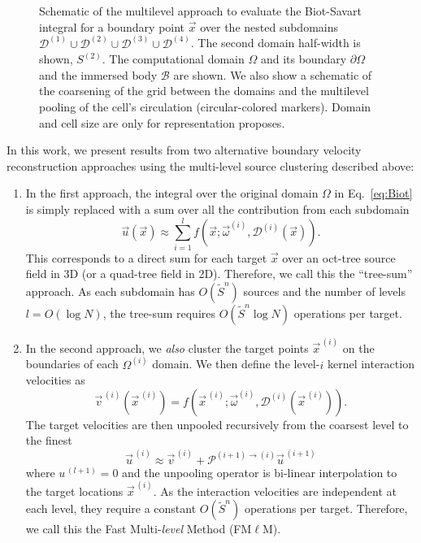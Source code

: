 \documentclass[final,1p,times]{elsarticle}
\begin{document}
\begin{figure}
    \centering
    \def\svgwidth{0.7\columnwidth}
    
    \caption{Schematic of the multilevel approach to evaluate the Biot-Savart integral for a boundary point $\vec x$ over the nested subdomains $\mathcal{D}^{(1)} \cup \mathcal{D}^{(2)} \cup \mathcal{D}^{(3)} \cup \mathcal{D}^{(4)}$. The second domain half-width is shown, ${S}^{(2)}$. The computational domain $\Omega$ and its boundary $\partial\Omega$ and the immersed body $\mathcal{B}$ are shown. We also show a schematic of the coarsening of the grid between the domains and the multilevel pooling of the cell's circulation (circular-colored markers). Domain and cell size are only for representation proposes.}
    \label{Fig_2}
\end{figure}

In this work, we present results from two alternative boundary velocity reconstruction approaches using the multi-level source clustering described above:

\begin{enumerate}
    \item In the first approach, the integral over the original domain $\Omega$ in Eq.~\ref{eq:Biot} is simply replaced with a sum over all the contribution from each subdomain
    \begin{equation}\label{eq:biot_sum}
        \vec u(\vec{x}) \approx \sum_{i=1}^{l} f(\vec{x}; \vec \omega^{(i)},\mathcal{D}^{(i)}(\vec x)).
    \end{equation}
    This corresponds to a direct sum for each target $\vec x$ over an oct-tree source field in 3D (or a quad-tree field in 2D). Therefore, we call this the ``tree-sum'' approach. As each subdomain has $O(\tilde S^n)$ sources and the number of levels $l=O(\log N)$, the tree-sum requires $O(\tilde S^n\log N)$ operations per target.
    \item In the second approach, we \textit{also} cluster the target points $\vec  x^{\,(i)}$ on the boundaries of each $\Omega^{(i)}$ domain. We then define the level-$i$ kernel interaction velocities as
    \begin{equation}\label{eq:interaction}
        \vec v^{\,(i)}(\vec x^{\,(i)}) = f(\vec x^{\,(i)}; \vec \omega^{(i)},\mathcal{D}^{(i)}(\vec x^{\,(i)})).
    \end{equation}
    The target velocities are then unpooled recursively from the coarsest level to the finest
    \begin{equation}\label{eq:unpool}
        \vec u^{\,(i)} \approx \vec v^{\,(i)}+\mathcal{P}^{(i+1)\to(i)} \vec u^{\,(i+1)}
    \end{equation}
    where $u^{\,(l+1)}=0$ and the unpooling operator is bi-linear interpolation to the target locations $\vec x^{\,(i)}$. As the interaction velocities are independent at each level, they require a constant $O(\tilde S^n)$ operations per target. Therefore, we call this the Fast Multi-\textit{level} Method (FM$\ell$M). 
\end{enumerate}
\end{document}
